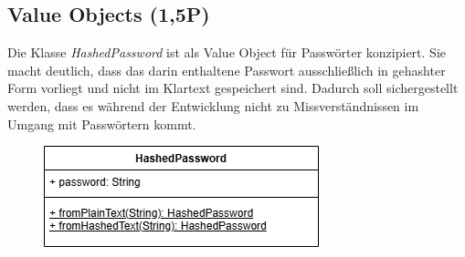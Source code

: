 \subsection{Value Objects (1,5P)}
Die Klasse \textit{HashedPassword} ist als Value Object für Passwörter konzipiert. Sie macht deutlich, dass das darin enthaltene Passwort ausschließlich in gehashter Form vorliegt und nicht im Klartext gespeichert sind. Dadurch soll sichergestellt werden, dass es während der Entwicklung nicht zu Missverständnissen im Umgang mit Passwörtern kommt.
\begin{figure}[htbp]
    \centering
\includegraphics{kapitel6_ddd/valueobject.drawio.png}
\end{figure}